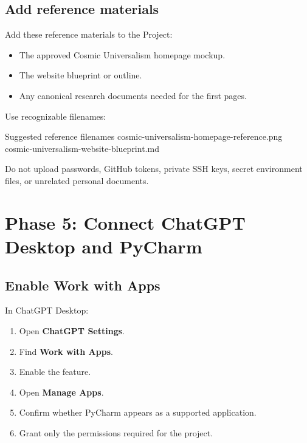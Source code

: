 \documentclass[11pt,letterpaper]{article}
\newcommand{\menu}[1]{\textbf{\textsf{#1}}}
\begin{document}
\subsection{Add reference materials}

Add these reference materials to the Project:

\begin{itemize}
    \item The approved Cosmic Universalism homepage mockup.
    \item The website blueprint or outline.
    \item Any canonical research documents needed for the first pages.
\end{itemize}

Use recognizable filenames:

\begin{codebox}{Suggested reference filenames}
cosmic-universalism-homepage-reference.png
cosmic-universalism-website-blueprint.md
\end{codebox}

\begin{safetybox}
Do not upload passwords, GitHub tokens, private SSH keys, secret
environment files, or unrelated personal documents.
\end{safetybox}

\section{Phase 5: Connect ChatGPT Desktop and PyCharm}

\subsection{Enable Work with Apps}

In ChatGPT Desktop:

\begin{enumerate}
    \item Open \menu{ChatGPT \textrightarrow{} Settings}.
    \item Find \menu{Work with Apps}.
    \item Enable the feature.
    \item Open \menu{Manage Apps}.
    \item Confirm whether PyCharm appears as a supported application.
    \item Grant only the permissions required for the project.
\end{enumerate}
\end{document}
